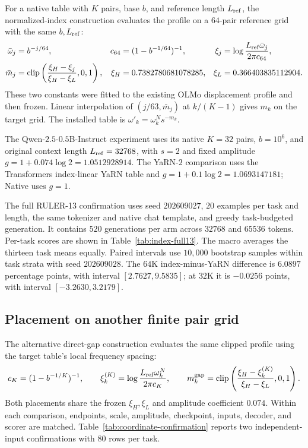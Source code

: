 For a native table with $K$ pairs, base $b$, and reference length
$L_{\rm ref}$, the normalized-index construction evaluates the profile on
a $64$-pair reference grid with the same $b,L_{\rm ref}$:
\begin{align}
\bar\omega_j&=b^{-j/64},&
c_{64}&=(1-b^{-1/64})^{-1},&
\xi_j&=\log\frac{L_{\rm ref}\bar\omega_j}{2\pi c_{64}},\\
\bar m_j&=\operatorname{clip}\left(
\frac{\xi_H-\xi_j}{\xi_H-\xi_L},0,1\right),&
\xi_H&=0.7382780681078285,&
\xi_L&=0.366403835112904 .
\end{align}
These two constants were fitted to the existing OLMo displacement profile and
then frozen. Linear interpolation of $(j/63,\bar m_j)$ at $k/(K-1)$ gives
$m_k$ on the target grid. The installed table is
$\omega'_k=\omega_k^N s^{-m_k}$.

The Qwen-$2.5$-$0.5$B-Instruct experiment uses its native $K=32$ pairs,
$b=10^6$, and original context length $L_{\rm ref}=32768$, with $s=2$ and fixed amplitude
$g=1+0.074\log2=1.0512928914$. The YaRN-$2$ comparison uses the
Transformers index-linear YaRN table and $g=1+0.1\log2=1.0693147181$;
Native uses $g=1$.

The full RULER-13 confirmation uses seed $202609027$, $20$ examples per
task and length, the same tokenizer and native chat template, and greedy
task-budgeted generation. It contains $520$ generations per arm across
$32768$ and $65536$ tokens. Per-task scores are shown in
Table~\ref{tab:index-full13}. The macro averages the thirteen task means
equally. Paired intervals use $10{,}000$ bootstrap samples within task strata
with seed $202609028$.
The $64$K index-minus-YaRN difference is $6.0897$ percentage points,
with interval $[2.7627,9.5835]$; at $32$K it is $-0.0256$ points,
with interval $[-3.2630,3.2179]$.



\FloatBarrier
\subsection{Placement on another finite pair grid}
\label{sec:coordinate-confirmation}

The alternative direct-gap construction evaluates the same clipped profile
using the target table's local frequency spacing:
\[
c_K=(1-b^{-1/K})^{-1},\qquad
\xi_k^{(K)}=\log\frac{L_{\rm ref}\omega_k^N}{2\pi c_K},\qquad
m_k^{\rm gap}=\operatorname{clip}
\left(\frac{\xi_H-\xi_k^{(K)}}{\xi_H-\xi_L},0,1\right).
\]
Both placements share the frozen $\xi_H,\xi_L$ and amplitude coefficient
$0.074$. Within each comparison, endpoints, scale, amplitude, checkpoint,
inputs, decoder, and scorer are matched. Table~\ref{tab:coordinate-confirmation}
reports two independent-input confirmations with $80$ rows per task.


